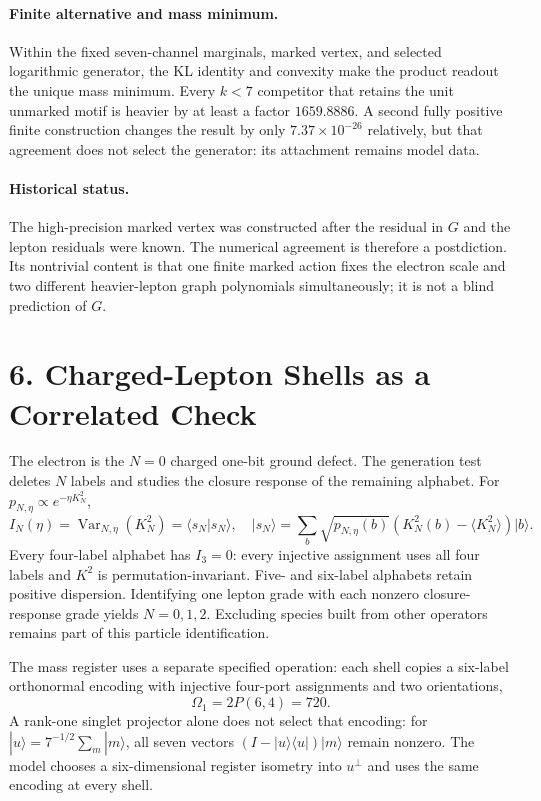 \documentclass[11pt]{article}
\begin{document}
\paragraph{Finite alternative and mass minimum.}
Within the fixed seven-channel marginals, marked vertex, and selected logarithmic generator, the KL identity and convexity make the product readout the unique mass minimum. Every $k<7$ competitor that retains the unit unmarked motif is heavier by at least a factor $1659.8886$. A second fully positive finite construction changes the result by only $7.37\times10^{-26}$ relatively, but that agreement does not select the generator: its attachment remains model data.

\paragraph{Historical status.}
The high-precision marked vertex was constructed after the residual in $G$ and the lepton residuals were known. The numerical agreement is therefore a postdiction. Its nontrivial content is that one finite marked action fixes the electron scale and two different heavier-lepton graph polynomials simultaneously; it is not a blind prediction of $G$.

\section{6. Charged-Lepton Shells as a Correlated Check}

The electron is the $N=0$ charged one-bit ground defect. The generation test deletes $N$ labels and studies the closure response of the remaining alphabet. For $p_{N,\eta}\propto e^{-\eta K_N^2}$,
\[
I_N(\eta)=\operatorname{Var}_{N,\eta}(K_N^2)=\langle s_N|s_N\rangle,
\quad
|s_N\rangle=\sum_b\sqrt{p_{N,\eta}(b)}
(K_N^2(b)-\langle K_N^2\rangle)|b\rangle.
\]
Every four-label alphabet has $I_3=0$: every injective assignment uses all four labels and $K^2$ is permutation-invariant. Five- and six-label alphabets retain positive dispersion. Identifying one lepton grade with each nonzero closure-response grade yields $N=0,1,2$. Excluding species built from other operators remains part of this particle identification.

The mass register uses a separate specified operation: each shell copies a six-label orthonormal encoding with injective four-port assignments and two orientations,
\[
\Omega_1=2P(6,4)=720.
\]
A rank-one singlet projector alone does not select that encoding: for $|u\rangle=7^{-1/2}\sum_m|m\rangle$, all seven vectors $(I-|u\rangle\langle u|)|m\rangle$ remain nonzero. The model chooses a six-dimensional register isometry into $u^\perp$ and uses the same encoding at every shell.
\end{document}
